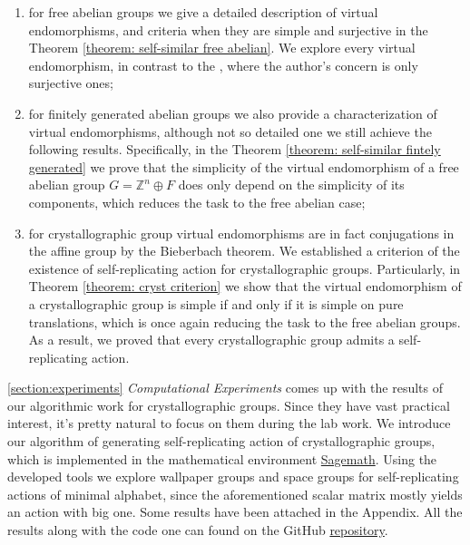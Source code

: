 \documentclass[a4paper,12pt]{amsart}
\theoremstyle{definition}
\begin{document}
	\begin{enumerate}
		\item for free abelian groups we give a detailed description of virtual endomorphisms, and criteria when they are simple and surjective in the Theorem \ref{theorem: self-similar free abelian}. We explore every virtual endomorphism, in contrast to the \cite{Nekrashevych:virtual_endomorphisms}, where the author's concern is only surjective ones; 
		
		\item for finitely generated abelian groups we also provide a characterization of virtual endomorphisms, although not so detailed one we still achieve the following results. Specifically, in the Theorem \ref{theorem: self-similar fintely generated} we prove that the simplicity of the virtual endomorphism of a free abelian group $G = \mathbb{Z}^n \oplus F$ does only depend on the simplicity of its components, which reduces the task to the free abelian case;  
		
		\item for crystallographic group virtual endomorphisms are in fact conjugations in the affine group by the Bieberbach theorem. We established a criterion of the existence of self-replicating action for crystallographic groups. Particularly, in Theorem \ref{theorem: cryst criterion} we show that the virtual endomorphism of a crystallographic group is simple if and only if it is simple on pure translations, which is once again reducing the task to the free abelian groups. As a result, we proved that every crystallographic group admits a self-replicating action. 
	\end{enumerate}
	\ref{section:experiments} \textit{Computational Experiments} comes up with the results of our algorithmic work for crystallographic groups. Since they have vast practical interest, it's pretty natural to focus on them during the lab work. We introduce our algorithm of generating self-replicating action of crystallographic groups, which is implemented in the mathematical environment \href{https://www.sagemath.org/}{Sagemath}. Using the developed tools we explore wallpaper groups and space groups for self-replicating actions of minimal alphabet, since the aforementioned scalar matrix mostly yields an action with big one. Some results have been attached in the Appendix. All the results along with the code one can found on the GitHub \href{https://github.com/davendiy/master_thesis}{repository}.
	
		
\end{document}
